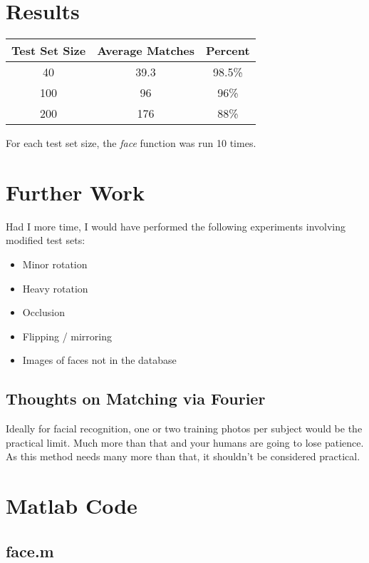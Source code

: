 \documentclass{article}
\begin{document}
\section{Results}

\begin{center}
\begin{tabular}{c | c | c}
  Test Set Size & Average Matches & Percent\\
  \hline
  40 & 39.3 & 98.5\%\\
  100 & 96 & 96\%\\
  200 & 176 & 88\%
\end{tabular}
\end{center}

For each test set size, the \emph{face} function was run 10 times.

\section{Further Work}
Had I more time, I would have performed the following experiments involving
modified test sets:

\begin{itemize}
\item Minor rotation
\item Heavy rotation
\item Occlusion
\item Flipping / mirroring
\item Images of faces not in the database
\end{itemize}

\subsection{Thoughts on Matching via Fourier}
Ideally for facial recognition, one or two training photos per subject
would be the practical limit. Much more than that and your humans are
going to lose patience. As this method needs many more than that,
it shouldn't be considered practical.

\onecolumn

\section{Matlab Code}

\subsection{face.m}


\end{document}
